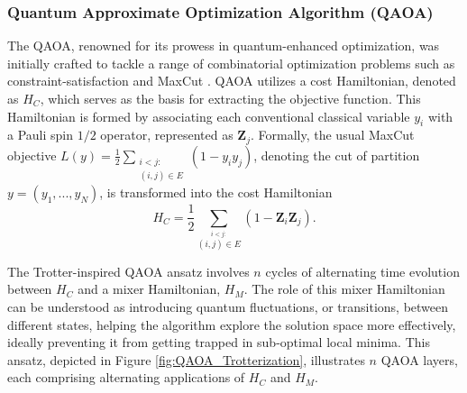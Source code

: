 
\subsubsection{Quantum Approximate Optimization Algorithm (QAOA)}
\label{sec: QAOA}

The QAOA, renowned for its prowess in quantum-enhanced optimization, was initially crafted to tackle a range of combinatorial optimization problems such as constraint-satisfaction \cite{lin2016performance} and MaxCut \cite{PhysRevA.97.022304}. QAOA utilizes a cost Hamiltonian, denoted as \(H_C\), which serves as the basis for extracting the objective function. This Hamiltonian is formed by associating each conventional classical variable $y_i$ with a Pauli spin \(1/2\) operator, represented as \(\boldsymbol{Z}_j\). Formally, the usual MaxCut objective $L(y) = \frac{1}{2}\sum_{\substack{i < j: \\ (i,j)\in E}}(1-y_{i}y_{j})$, denoting the cut of partition $y = (y_1,...,y_N)$, is transformed into the cost Hamiltonian
\begin{equation}\label{eq:H_C}\tag{6}
  H_C = \frac{1}{2}\sum_{\stackrel{i < j:}{(i,j)\in E}}(1-\boldsymbol{Z}_i\boldsymbol{Z}_j).
\end{equation}

The Trotter-inspired QAOA ansatz involves $n$ cycles of alternating time evolution between $H_C$ and a mixer Hamiltonian, $H_M$. The role of this mixer Hamiltonian can be understood as introducing quantum fluctuations, or transitions, between different states, helping the algorithm explore the solution space more effectively, ideally preventing it from getting trapped in sub-optimal local minima. This ansatz, depicted in Figure \ref{fig:QAOA_Trotterization}, illustrates $n$ QAOA layers, each comprising alternating applications of $H_C$ and $H_M$. 


